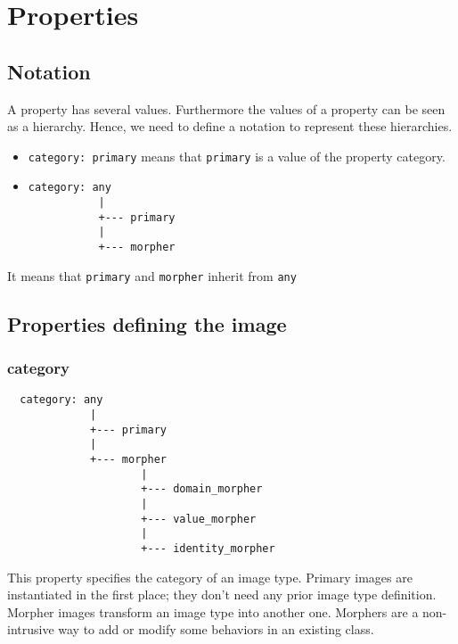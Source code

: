 \section{Properties}


\subsection{Notation}

A property has several values.
Furthermore the values of a property can be seen as a hierarchy.
Hence, we need to define a notation to represent these hierarchies.
\begin{itemize}

\item \verb+category: primary+ means that \verb+primary+ is a value of the
property category.

\item
\begin{verbatim}
category: any
           |
           +--- primary
           |
           +--- morpher
\end{verbatim}
\end{itemize} It means that \verb+primary+ and \verb+morpher+ inherit from
\verb+any+

\subsection{Properties defining the image}

\subsubsection{category}


\begin{verbatim}
  category: any
             |
             +--- primary
             |
             +--- morpher
                     |
                     +--- domain_morpher
                     |
                     +--- value_morpher
                     |
                     +--- identity_morpher
\end{verbatim}


This property specifies the category of an image type.
Primary images are instantiated in the first place; they don't need any
prior image type definition.
Morpher images transform an image type into another one.
Morphers are a non-intrusive way to add or modify some behaviors in an
existing class.


